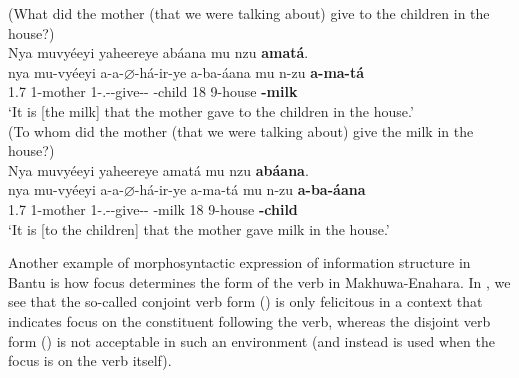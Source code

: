 \documentclass[output=paper]{langscibook}
\begin{document}
\ex
(What did the mother (that we were talking about) give to the children in the house?)\\
Nya muvyéeyi yaheereye abáana mu nzu \textbf{amatá}.\\
\gll
nya  mu-vyéeyi  a-a-$\varnothing$-há-ir-ye  a-ba-áana  mu  n-zu  \textbf{a-ma-tá}\\
1.\DEM{}7  1-mother  1\SM-\N.\PST-\CJ{}-give-\APPL-\PFV{}  -child  18  9-house  \textbf{-milk}\\
\glt
‘It is [the milk]\textsubscript{\FOC} that the mother gave to the children in the house.’\\


\ex
(To whom did the mother (that we were talking about) give the milk in the house?)\\
Nya muvyéeyi yaheereye amatá mu nzu \textbf{abáana}.\\
\gll
nya  mu-vyéeyi  a-a-$\varnothing$-há-ir-ye  a-ma-tá  mu  n-zu  \textbf{a-ba-áana}\\
1.\DEM{}7  1-mother  1\SM-\N.\PST-\CJ{}-give-\APPL-\PFV{}  -milk  18  9-house  \textbf{}\textbf{{}-child}\\
\glt
‘It is [to the children]\textsubscript{\FOC} that the mother gave milk in the house.’\\


\z
\z


Another example of morphosyntactic expression of information structure in Bantu is how focus determines the form of the verb in Makhuwa-Enahara. In , we see that the so-called conjoint verb form (\CJ{}) is only felicitous in a context that indicates focus on the constituent following the verb, whereas the disjoint verb form (\DJ{}) is not acceptable in such an environment (and instead is used when the focus is on the verb itself).
\end{document}

